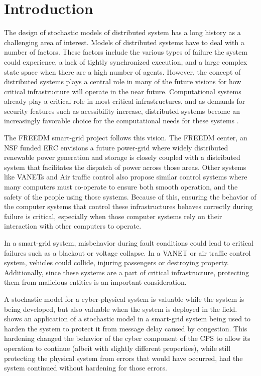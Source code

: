 \section{Introduction}

The design of stochastic models of distributed system has a long history as a challenging area of interest. Models of distributed systems have to deal with a number of factors. These factors include the various types of failure the system could experience, a lack of tightly synchronized execution, and a large complex state space when there are a high number of agents\cite{DISTRIBUTED}\cite{distributed-challenges}.  However, the concept of distributed systems plays a central role in many of the future visions for how critical infrastructure will operate in the near future. Computational systems already play a critical role in most critical infrastructures, and as demands for security features such as acessibility increase, distributed systems become an increasingly favorable choice for the computational needs for these systems \cite{SMARTGRIDBENEFITS}.

The \ac{FREEDM}\cite{FREEDM} smart-grid project follows this vision. The \ac{FREEDM} center, an NSF funded ERC envisions a future power-grid where widely distributed renewable power generation and storage is closely coupled with a distributed system that facilitates the dispatch of power across those areas. Other systems like \ac{VANET}s\cite{CARS1}\cite{CARS2} and Air traffic control \cite{AIRTRAFFIC1}\cite{AIRTRAFFIC2} also propose similar control systems where many computers must co-operate to ensure both smooth operation, and the safety of the people using those systems. Because of this, ensuring the behavior of the computer systems that control these infrastructures behaves correctly during failure is critical, especially when those computer systems rely on their interaction with other computers to operate.

In a smart-grid system, misbehavior during fault conditions could lead to critical failures such as a blackout or voltage collapse. In a \ac{VANET} or air traffic control system, vehicles could collide, injuring passengers or destroying property. Additionally, since these systems are a part of critical infrastructure, protecting them from malicious entities is an important consideration.

A stochastic model for a cyber-physical system is valuable while the system is being developed, but also valuable when the system is deployed in the field. \cite{safecomp-jackson} shows an application of a stochastic model in a smart-grid system being used to harden the system to protect it from message delay caused by congestion. This hardening changed the behavior of the cyber component of the \ac{CPS} to allow its operation to continue (albeit with slightly different properties), while still protecting the physical system from errors that would have occurred, had the system continued without hardening for those errors.

